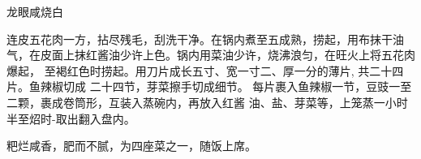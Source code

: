 \begin{recipe}{龙眼咸烧白}

\ingredients


\cooking

\step 连皮五花肉一方，拈尽残毛，刮洗干净。在锅内煮至五成熟，捞起，用布抹干油
气，在皮面上抹红酱油少许上色。锅内用菜油少许，烧沸浪匀，在旺火上将五花肉爆起，
至褐红色时捞起。用刀片成长五寸、宽一寸二、厚一分的薄片, 共二十四片。鱼辣椒切成
二十四节，芽菜擦手切成细节。
\step 每片裹入鱼辣椒一节，豆豉一至二颗，裹成卷筒形，互装入蒸碗内，再放入红酱
油、盐、芽菜等，上笼蒸一小时半至炤时-取出翻入盘内。

\notes

粑烂咸香，肥而不腻，为四座菜之一，随饭上席。

\end{recipe}


